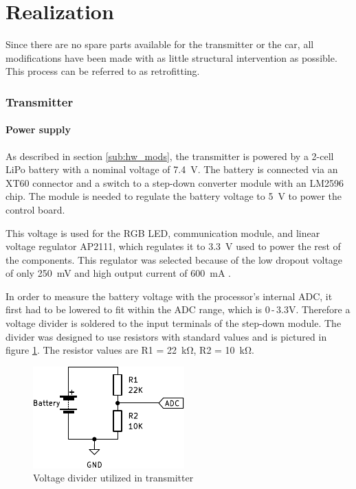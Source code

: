 


\part{Realization}
\label{chap:realization}
Since there are no spare parts available for the transmitter or the car, all modifications have been made with as little structural intervention as possible. This process can be referred to as retrofitting.

\section{Transmitter}
\label{sec:real_tx}
\subsection{Power supply}
As described in section \ref{sub:hw_mods}, the transmitter is powered by a 2-cell LiPo battery with a nominal voltage of \SI{7.4}{\V}. The battery is connected via an XT60 connector and a switch to a step-down converter module with an LM2596 chip. The module is needed to regulate the battery voltage to \SI{5}{\V} to power the control board.

This voltage is used for the RGB LED, communication module, and linear voltage regulator AP2111, which regulates it to \SI{3.3}{\V} used to power the rest of the components. This regulator was selected because of the low dropout voltage of only \SI{250}{\mV} and high output current of \SI{600}{\mA} \cite{ap_datasheet}.		%

In order to measure the battery voltage with the processor's internal ADC, it first had to be lowered to fit within the ADC range, which is $0\, \text{-}\, 3.3$\unit{\V}. Therefore a voltage divider is soldered to the input terminals of the step-down module. The divider was designed to use resistors with standard values and is pictured in figure \ref{fig:tx_div}. The resistor values are R1 = \SI{22}{\kohm}, R2 = \SI{10}{\kohm}.
\begin{figure}[ht]
\centering
\includegraphics[width=0.4\linewidth]{fig/voltage_divider.pdf}
\caption{Voltage divider utilized in transmitter }
\label{fig:tx_div}
\end{figure}

